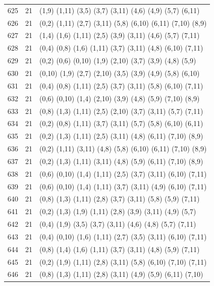 \begin{appendix}
{\begin{longtable}{lll}
625& 21 & (1,9)   (1,11) (3,5)  (3,7)   (3,11)  (4,6)   (4,9)   (5,7)   (6,11)\\
626& 21 & (0,2)   (1,11) (2,7)  (3,11)  (5,8)   (6,10)  (6,11)  (7,10)  (8,9)\\
627& 21 & (1,4)   (1,6)  (1,11) (2,5)   (3,9)   (3,11)  (4,6)   (5,7)   (7,11)\\
628& 21 & (0,4)   (0,8)  (1,6)  (1,11)  (3,7)   (3,11)  (4,8)   (6,10)  (7,11)\\
629& 21 & (0,2)   (0,6)  (0,10) (1,9)   (2,10)  (3,7)   (3,9)   (4,8)   (5,9)\\
630& 21 & (0,10)  (1,9)  (2,7)  (2,10)  (3,5)   (3,9)   (4,9)   (5,8)   (6,10)\\
631& 21 & (0,4)   (0,8)  (1,11) (2,5)   (3,7)   (3,11)  (5,8)   (6,10)  (7,11)\\
632& 21 & (0,6)   (0,10) (1,4)  (2,10)  (3,9)   (4,8)   (5,9)   (7,10)  (8,9)\\
633& 21 & (0,8)   (1,3)  (1,11) (2,5)   (2,10)  (3,7)   (3,11)  (5,7)   (7,11)\\
634& 21 & (0,2)   (0,8)  (1,11) (3,7)   (3,11)  (5,7)   (5,8)   (6,10)  (6,11)\\
635& 21 & (0,2)   (1,3)  (1,11) (2,5)   (3,11)  (4,8)   (6,11)  (7,10)  (8,9)\\
636& 21 & (0,2)   (1,11) (3,11) (4,8)   (5,8)   (6,10)  (6,11)  (7,10)  (8,9)\\
637& 21 & (0,2)   (1,3)  (1,11) (3,11)  (4,8)   (5,9)   (6,11)  (7,10)  (8,9)\\
638& 21 & (0,6)   (0,10) (1,4)  (1,11)  (2,5)   (3,7)   (3,11)  (6,10)  (7,11)\\
639& 21 & (0,6)   (0,10) (1,4)  (1,11)  (3,7)   (3,11)  (4,9)   (6,10)  (7,11)\\
640& 21 & (0,8)   (1,3)  (1,11) (2,8)   (3,7)   (3,11)  (5,8)   (5,9)   (7,11)\\
641& 21 & (0,2)   (1,3)  (1,9)  (1,11)  (2,8)   (3,9)   (3,11)  (4,9)   (5,7)\\
642& 21 & (0,4)   (1,9)  (3,5)  (3,7)   (3,11)  (4,6)   (4,8)   (5,7)   (7,11)\\
643& 21 & (0,4)   (0,10) (1,6)  (1,11)  (2,7)   (3,5)   (3,11)  (6,10)  (7,11)\\
644& 21 & (0,8)   (1,4)  (1,6)  (1,11)  (3,7)   (3,11)  (4,8)   (5,9)   (7,11)\\
645& 21 & (0,2)   (1,9)  (1,11) (2,8)   (3,11)  (5,8)   (6,10)  (7,10)  (7,11)\\
646& 21 & (0,8)   (1,3)  (1,11) (2,8)   (3,11)  (4,9)   (5,9)   (6,11)  (7,10)\\

\end{longtable}}
\end{appendix}
